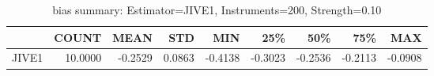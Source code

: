 \begin{table}[ht]
\centering
\caption{bias summary: Estimator=JIVE1, Instruments=200, Strength=0.10}
\begin{tabular}{lrrrrrrrr}
\toprule
 & COUNT & MEAN & STD & MIN & 25\% & 50\% & 75\% & MAX \\
\midrule
JIVE1 & 10.0000 & -0.2529 & 0.0863 & -0.4138 & -0.3023 & -0.2536 & -0.2113 & -0.0908 \\
\bottomrule
\end{tabular}
\end{table}
